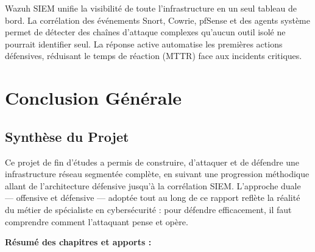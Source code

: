 \documentclass[12pt,a4paper,openany]{report}
\begin{document}
\begin{tcolorbox}[colback=primary!5!white, colframe=primary, title=\textbf{Bilan du Chapitre 8}]
Wazuh SIEM unifie la visibilité de toute l'infrastructure en un seul tableau de bord. La corrélation
des événements Snort, Cowrie, pfSense et des agents système permet de détecter des chaînes d'attaque
complexes qu'aucun outil isolé ne pourrait identifier seul. La réponse active automatise les premières
actions défensives, réduisant le temps de réaction (MTTR) face aux incidents critiques.
\end{tcolorbox}

\chapter*{Conclusion Générale}

\section*{Synthèse du Projet}

Ce projet de fin d'études a permis de construire, d'attaquer et de défendre une infrastructure réseau
segmentée complète, en suivant une progression méthodique allant de l'architecture défensive jusqu'à
la corrélation SIEM. L'approche duale --- offensive et défensive --- adoptée tout au long de ce rapport
reflète la réalité du métier de spécialiste en cybersécurité : pour défendre efficacement, il faut
comprendre comment l'attaquant pense et opère.

\textbf{Résumé des chapitres et apports :}
\end{document}
